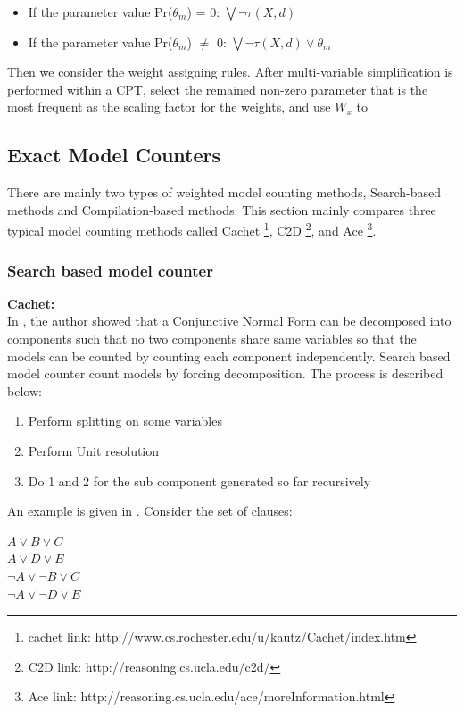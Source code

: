         \begin{itemize}
            \item If the parameter value Pr($\theta_{m}$) = 0: $\bigvee \neg \tau(X, d)$ 
            \item If the parameter value Pr($\theta_{m}$) $\neq$ 0: $\bigvee \neg \tau(X, d) \vee \theta_{m}$ 
        \end{itemize}
        
        Then we consider the weight assigning rules. After multi-variable simplification is performed within a CPT, select the remained non-zero parameter that is the most frequent as the scaling factor for the weights, and use $W_{x}$ to 


    \subsection{Exact Model Counters}
    There are mainly two types of weighted model counting methods, Search-based methods and Compilation-based methods. This section mainly compares three typical model counting methods called Cachet \footnote{cachet link: http://www.cs.rochester.edu/u/kautz/Cachet/index.htm}, C2D \footnote{C2D link: http://reasoning.cs.ucla.edu/c2d/}, and Ace \footnote{Ace link: http://reasoning.cs.ucla.edu/ace/moreInformation.html}.
    \subsubsection{Search based model counter}
    \textbf{Cachet:}\\
    In \cite{Bayardo:2000:CMU:647288.721114}, the author showed that a Conjunctive Normal Form can be decomposed into components such that no two components share same variables
    so that the models can be counted by counting each component independently.
    Search based model counter count models by forcing decomposition. The process is described below:
    \begin{enumerate}
        \item Perform splitting on some variables
        \item Perform Unit resolution
        \item Do 1 and 2 for the sub component generated so far recursively 
    \end{enumerate}
    An example is given in \cite{2008-literature-review}. Consider the set of clauses:\\
    \begin{center}
        $A \vee B \vee C$\\
        $A \vee D \vee E$\\
        $\neg A \vee \neg B \vee C$\\
        $\neg A \vee \neg D \vee E$\\
    \end{center}
    
